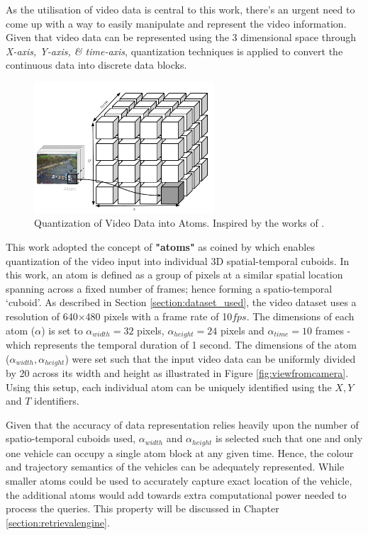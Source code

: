 As the utilisation of video data is central to this work, there's an urgent need to come up with a way to easily manipulate and represent the video information. Given that video data can be represented using the 3 dimensional space through \textit{X-axis, Y-axis, \& time-axis}, quantization techniques is applied to convert the continuous data into discrete data blocks.


\begin{figure}[H]\centering
\includegraphics[width=0.6\textwidth]{image/general/atom.PNG}
\caption[Quantization of Video Data into Atoms.]
{Quantization of Video Data into Atoms.
Inspired by the works of .}
\label{fig:atoms}
\end{figure}


This work adopted the concept of \textbf{"atoms"} as coined by \cite{castanon2016retrieval} which enables quantization of the video input into individual 3D spatial-temporal cuboids. In this work, an atom is defined as a group of pixels at a similar spatial location spanning across a fixed number of frames; hence forming a spatio-temporal `cuboid'.
As described in Section \ref{section:dataset_used}, the video dataset uses a resolution of 640$\times$480 pixels with a frame rate of 10$fps$.
The dimensions of each atom ($\alpha$) is set to $\alpha_{width}=32$ pixels, $\alpha_{height}=24$ pixels and $\alpha_{time}=10$ frames - which represents the temporal duration of 1 second.
The dimensions of the atom ($\alpha_{width},\alpha_{height}$) were set such that the input video data can be uniformly divided by 20 across its width and height as illustrated in Figure \ref{fig:viewfromcamera}. Using this setup, each individual atom can be uniquely identified using the $X, Y$ and $T$ identifiers.

Given that the accuracy of data representation relies heavily upon the number of spatio-temporal cuboids used, $\alpha_{width}$ and $\alpha_{height}$ is selected such that one and only one vehicle can occupy a single atom block at any given time. Hence, the colour and trajectory semantics of the vehicles can be adequately represented.
While smaller atoms could be used to accurately capture exact location of the vehicle, the additional atoms would add towards extra computational power needed to process the queries. This property will be discussed in Chapter \ref{section:retrievalengine}.

